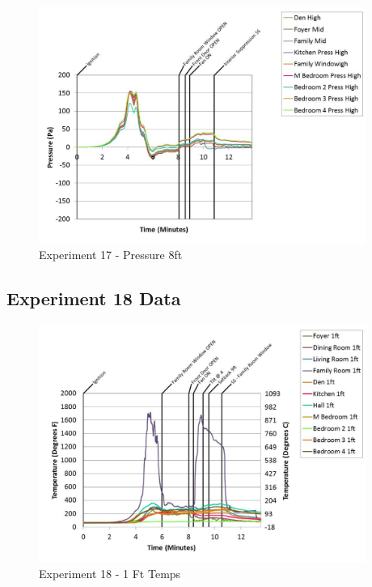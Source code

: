 \documentclass{article}
\begin{document}
\begin{appendices}
	\begin{figure}[h!]
		\centering
		\includegraphics[height=3.05in]{0_Images/Results_Charts/Exp_17_Charts/Pressure8ft.pdf}
		\caption{Experiment 17 - Pressure 8ft}
	\end{figure}
 
	\clearpage

		\clearpage
\clearpage		\large
\subsection{Experiment 18 Data} \label{App:Exp18Results} 

	\begin{figure}[h!]
		\centering
		\includegraphics[height=3.05in]{0_Images/Results_Charts/Exp_18_Charts/1FtTemps.pdf}
		\caption{Experiment 18 - 1 Ft Temps}
	\end{figure}
 


\end{appendices}
\end{document}
